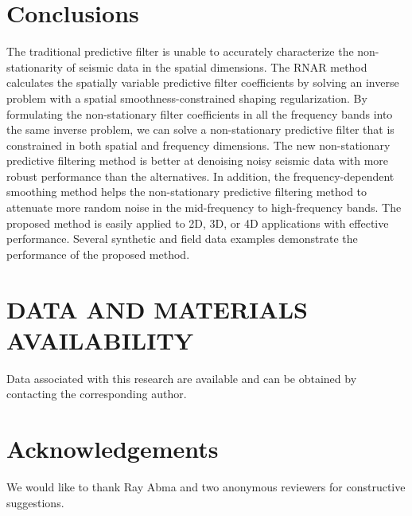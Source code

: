 


\section{Conclusions}
The traditional predictive filter is unable to accurately characterize the non-stationarity of seismic data in the spatial dimensions. 
The RNAR method calculates the spatially variable predictive filter coefficients by solving an inverse problem with a spatial smoothness-constrained shaping regularization. By formulating the non-stationary filter coefficients in all the frequency bands into the same inverse problem, we can solve a non-stationary predictive filter that is constrained in both spatial and frequency dimensions. The new non-stationary predictive filtering method is better at denoising noisy seismic data with more robust performance than the alternatives. In addition, the frequency-dependent smoothing method helps the non-stationary predictive filtering method to attenuate more random noise in the mid-frequency to high-frequency bands. The proposed method is easily applied to 2D, 3D, or 4D applications with effective performance. Several synthetic and field data examples demonstrate the  performance of the proposed method.


\section{DATA AND MATERIALS AVAILABILITY}
Data associated with this research are available and can be obtained by contacting the corresponding author.

\section{Acknowledgements}
We would like to thank Ray Abma and two anonymous reviewers for constructive suggestions. 






